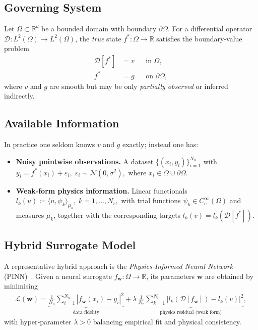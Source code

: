 \documentclass{article}
\theoremstyle{plain}
\theoremstyle{definition}
\theoremstyle{remark}
\begin{document}
\subsection{Governing System}
Let $\Omega\subset\mathbb{R}^{d}$ be a bounded domain with boundary $\partial\Omega$.  
For a differential operator $\mathscr{D}\!:L^{2}(\Omega)\to L^{2}(\Omega)$, the \emph{true} state
$f^{\ast}\!:\Omega\to\mathbb{R}$ satisfies the boundary‑value problem
\begin{align}
  \mathscr{D}[f^{\ast}] &= v && \text{in }\Omega, \label{eq:pde}\\
  f^{\ast} &= g && \text{on }\partial\Omega, \label{eq:bc}
\end{align}
where $v$ and $g$ are smooth but may be only \emph{partially observed} or inferred indirectly.

\subsection{Available Information}
In practice one seldom knows $v$ and $g$ exactly; instead one has:
\begin{itemize}
\item \textbf{Noisy pointwise observations.}\;
      A dataset $\{(x_{i},y_{i})\}_{i=1}^{N_{u}}$ with
      \(
        y_{i}=f^{\ast}(x_{i})+\varepsilon_{i},\;
        \varepsilon_{i}\sim\mathcal{N}(0,\sigma^{2}),
      \)
      where $x_{i}\in\Omega\cup\partial\Omega$.
\item \textbf{Weak‑form physics information.}\;
      Linear functionals
      $
        l_{k}(u) \coloneqq \langle u,\psi_{k}\rangle_{\mu_{k}},\;k=1,\dots,N_{r},
      $
      with trial functions $\psi_{k}\in C_{c}^{\infty}(\Omega)$
      and measures $\mu_{k}$,
      together with the corresponding targets
      $l_{k}(v)=l_{k}\!\left(\mathscr{D}[f^{\ast}]\right)$.
\end{itemize}

\subsection{Hybrid Surrogate Model}
\label{app:surrogate}
A representative hybrid approach is the
\emph{Physics‑Informed Neural Network} (PINN)~\citep{raissi2019physics}.
Given a neural surrogate $f_{\bm w}\!:\Omega\to\mathbb{R}$, its parameters $\bm w$ are obtained by minimising
\begin{align}
\mathcal{L}(\bm w)
  =\underbrace{\frac{1}{N_{u}}\sum_{i=1}^{N_{u}}
        \left|f_{\bm w}(x_{i})-y_{i}\right|^{2}}_{\text{data fidelity}}
  +\lambda\,
    \underbrace{\frac{1}{N_{r}}\sum_{k=1}^{N_{r}}
        \left|l_{k}\!\left(\mathscr{D}[f_{\bm w}]\right)-l_{k}(v)\right|^{2}}%
        _{\text{physics residual (weak form)}},
  \label{eq:hybrid-loss}
\end{align}
with hyper‑parameter $\lambda>0$ balancing empirical fit and physical consistency.
\end{document}
